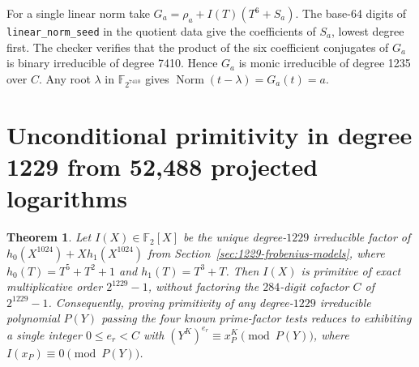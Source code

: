 \documentclass[11pt]{article}
\newtheorem{theorem}{Theorem}
\newcommand{\F}{\mathbb F_2}
\begin{document}
For a single linear norm take \(G_a=\rho_a+I(T)(T^6+S_a)\).
The base-64 digits of \texttt{linear\_norm\_seed} in the quotient
data give the coefficients of \(S_a\), lowest degree first.
The checker verifies that the product of the six coefficient conjugates
of \(G_a\) is binary irreducible of degree 7410. Hence \(G_a\) is
monic irreducible of degree 1235 over \(C\). Any root \(\lambda\)
in \(\mathbb F_{2^{7410}}\) gives \(\operatorname{Norm}(t-\lambda)=G_a(t)=a\).

\section{Unconditional primitivity in degree 1229 from 52,488 projected logarithms}
\label{sec:1229-q1024-primitivity}
\begin{theorem}\label{thm:1229-q1024-primitive}
Let \(I(X)\in\F[X]\) be the unique degree-\(1229\) irreducible factor of
\(h_0(X^{1024})+Xh_1(X^{1024})\) from Section~\ref{sec:1229-frobenius-models},
where \(h_0(T)=T^5+T^2+1\) and \(h_1(T)=T^3+T\). Then \(I(X)\) is primitive of
exact multiplicative order \(2^{1229}-1\), without factoring the \(284\)-digit
cofactor \(C\) of \(2^{1229}-1\). Consequently, proving primitivity of any
degree-\(1229\) irreducible polynomial \(P(Y)\) passing the four known
prime-factor tests reduces to exhibiting a single integer \(0\le e_r<C\) with
\((Y^K)^{e_r}\equiv x_P^K\pmod{P(Y)}\), where \(I(x_P)\equiv0\pmod{P(Y)}\).
\end{theorem}
\end{document}
